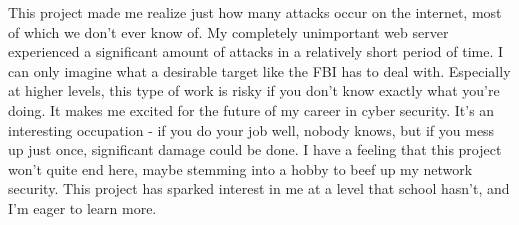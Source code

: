 \documentclass[12pt]{article}
\begin{document}
This project made me realize just how many attacks occur on the internet, most of which we don't ever know of.
My completely unimportant web server experienced a significant amount of attacks in a relatively short period of time.
I can only imagine what a desirable target like the FBI has to deal with.
Especially at higher levels, this type of work is risky if you don't know exactly what you're doing.
It makes me excited for the future of my career in cyber security.
It's an interesting occupation - if you do your job well, nobody knows, but if you mess up just once, significant damage could be done.
I have a feeling that this project won't quite end here, maybe stemming into a hobby to beef up my network security.
This project has sparked interest in me at a level that school hasn't, and I'm eager to learn more.

\nocite{cohen_honeypot}
\printbibliography

\end{document}
